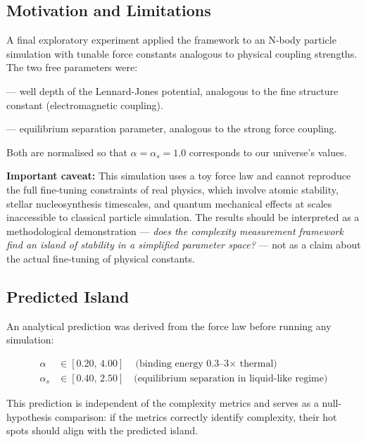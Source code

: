 \documentclass[12pt,a4paper]{article}
\begin{document}
\subsection{Motivation and Limitations}

A final exploratory experiment applied the framework to an N-body
particle simulation with tunable force constants analogous to physical
coupling strengths.
The two free parameters were:

\begin{description}[noitemsep]
  \item[$\alpha$] — well depth of the Lennard-Jones potential, analogous
    to the fine structure constant (electromagnetic coupling).
  \item[$\alpha_s$] — equilibrium separation parameter, analogous to
    the strong force coupling.
\end{description}

Both are normalised so that $\alpha = \alpha_s = 1.0$ corresponds to
our universe's values.

\textbf{Important caveat:} This simulation uses a toy force law and
cannot reproduce the full fine-tuning constraints of real physics,
which involve atomic stability, stellar nucleosynthesis timescales,
and quantum mechanical effects at scales inaccessible to classical
particle simulation.
The results should be interpreted as a methodological demonstration —
\emph{does the complexity measurement framework find an island of
stability in a simplified parameter space?} — not as a claim about
the actual fine-tuning of physical constants.

\subsection{Predicted Island}

An analytical prediction was derived from the force law before running
any simulation:

\begin{align}
\alpha   &\in [0.20,\, 4.00] \quad \text{(binding energy 0.3--3$\times$ thermal)} \\
\alpha_s &\in [0.40,\, 2.50] \quad \text{(equilibrium separation in liquid-like regime)}
\end{align}

This prediction is independent of the complexity metrics and serves
as a null-hypothesis comparison: if the metrics correctly identify
complexity, their hot spots should align with the predicted island.
\end{document}
